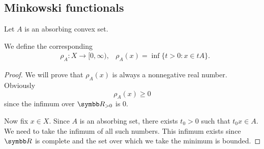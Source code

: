 \subsection{Minkowski functionals}\label{subsec:minkowski_functionals}

\begin{definition}\label{def:minkowski_functional}
  Let \( A \) is an absorbing convex set.

  We define the corresponding 
  \begin{align*}
    &\rho_A: X \to [0, \infty),
    &\rho_A(x) = \inf \{ t > 0 \colon x \in tA \}.
  \end{align*}
\end{definition}
\begin{proof}
  We will prove that \( \rho_A(x) \) is always a nonnegative real number. Obviously
  \begin{equation*}
    \rho_A(x) \geq 0
  \end{equation*}
  since the infimum over \( \R_{>0} \) is \( 0 \).

  Now fix \( x \in X \). Since \( A \) is an absorbing set, there exists \( t_0 > 0 \) such that \( t_0 x \in A \). We need to take the infimum of all such numbers. This infimum exists since \( \R \) is complete and the set over which we take the minimum is bounded.
\end{proof}
